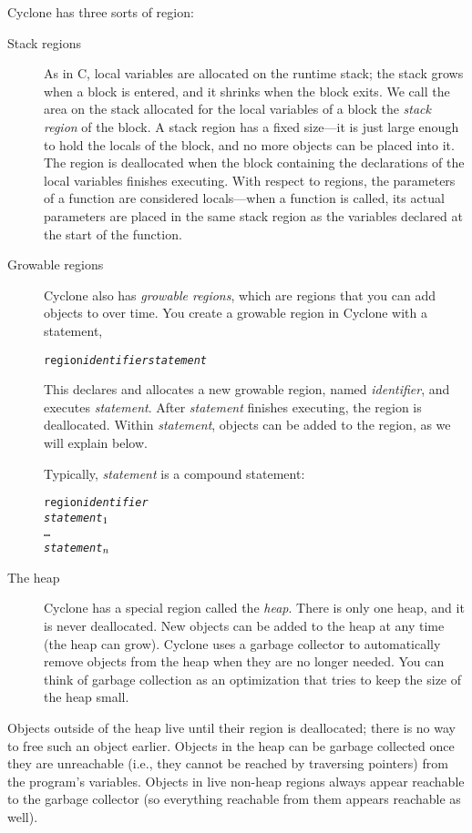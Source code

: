Cyclone has three sorts of region:
\begin{description}
\item[Stack regions] As in C, local variables are allocated on the
  runtime stack; the stack grows when a block is entered, and it
  shrinks when the block exits.  We call the area on the stack
  allocated for the local variables of a block the \emph{stack region}
  of the block.  A stack region has a fixed size---it is just large
  enough to hold the locals of the block, and no more objects can be
  placed into it.  The region is deallocated when the block containing
  the declarations of the local variables finishes executing.  With
  respect to regions, the parameters of a function are considered
  locals---when a function is called, its actual parameters are placed
  in the same stack region as the variables declared at the start of
  the function.
  
\item[Growable regions] Cyclone also has \emph{growable regions},
  which are regions that you can add objects to over time.  You create
  a growable region in Cyclone with a statement,
\begin{alltt}
  region {\it identifier} {\it statement}
\end{alltt}
  This declares and allocates a new growable region, named
  \textit{identifier}, and executes \textit{statement}.  After
  \textit{statement} finishes executing, the region is deallocated.
  Within \textit{statement}, objects can be added to the region, as we
  will explain below.

  Typically, \textit{statement} is a compound statement:
\begin{alltt}
  region \textit{identifier} \lb
    {\it statement}\(\sb{1}\)
    \ldots
    {\it statement}\(\sb{n}\)
  \rb
\end{alltt}

\item[The heap] Cyclone has a special region called the \emph{heap}.
  There is only one heap, and it is never deallocated.  New objects
  can be added to the heap at any time (the heap can grow).  Cyclone
  uses a garbage collector to automatically remove objects from the
  heap when they are no longer needed.  You can think of garbage
  collection as an optimization that tries to keep the size of the
  heap small.
\end{description}

Objects outside of the heap live until their region is deallocated;
there is no way to free such an object earlier.  Objects in the heap
can be garbage collected once they are unreachable (i.e., they cannot
be reached by traversing pointers) from the program's variables.
Objects in live non-heap regions always appear reachable to the
garbage collector (so everything reachable from them appears reachable
as well).

